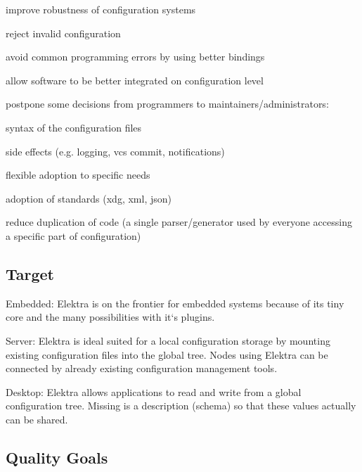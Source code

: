 
\begin{DoxyItemize}
\item improve robustness of configuration systems
\begin{DoxyItemize}
\item reject invalid configuration
\item avoid common programming errors by using better bindings
\end{DoxyItemize}
\item allow software to be better integrated on configuration level
\item postpone some decisions from programmers to maintainers/administrators\+:
\begin{DoxyItemize}
\item syntax of the configuration files
\item side effects (e.\+g. logging, vcs commit, notifications)
\item flexible adoption to specific needs
\item adoption of standards (xdg, xml, json)
\end{DoxyItemize}
\item reduce duplication of code (a single parser/generator used by everyone accessing a specific part of configuration)
\end{DoxyItemize}

\subsection*{Target}


\begin{DoxyItemize}
\item Embedded\+: Elektra is on the frontier for embedded systems because of its tiny core and the many possibilities with it`s plugins.
\item Server\+: Elektra is ideal suited for a local configuration storage by mounting existing configuration files into the global tree. Nodes using Elektra can be connected by already existing configuration management tools.
\item Desktop\+: Elektra allows applications to read and write from a global configuration tree. Missing is a description (schema) so that these values actually can be shared.
\end{DoxyItemize}

\subsection*{Quality Goals}


